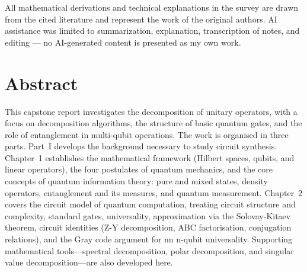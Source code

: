 \documentclass[12pt, a4paper, oneside]{report}
\theoremstyle{plain}
\theoremstyle{definition}
\theoremstyle{remark}
\begin{document}
All mathematical derivations and technical explanations in the survey are drawn from the cited literature
and represent the work of the original authors. AI assistance was limited to summarization,
explanation, transcription of notes, and editing --- no AI-generated content is presented as
my own work.


\clearpage
\thispagestyle{plain}
\chapter*{Abstract}

This capstone report investigates the decomposition of unitary operators, with a focus on decomposition algorithms, the structure of basic quantum gates, and the role of entanglement in multi-qubit operations. The work is organised in three parts.
Part~I develops the background necessary to study circuit synthesis. Chapter~1 establishes the mathematical framework (Hilbert spaces, qubits, and linear operators), the four postulates of quantum mechanics, and the core concepts of quantum information theory: pure and mixed states, density operators, entanglement and its measures, and quantum measurement. Chapter~2 covers the circuit model of quantum computation, treating circuit structure and complexity, standard gates, universality, approximation via the Solovay-Kitaev theorem, circuit identities (Z-Y decomposition, 
ABC factorisation, conjugation relations), and the Gray code argument for nn
n-qubit universality. Supporting mathematical tools---spectral decomposition, polar decomposition, and singular value decomposition---are also developed here.
\end{document}
